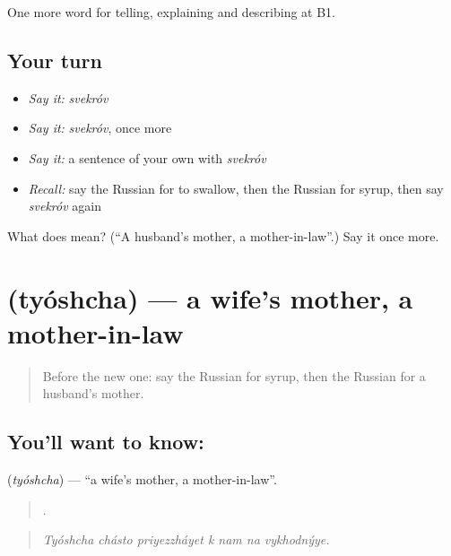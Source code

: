\begin{grammarlens}[title={What you've built}]
One more word for telling, explaining and describing at B1.
\end{grammarlens}

\subsection*{Your turn}
\begin{itemize}
\raggedright
  \item \emph{Say it:} \emph{svekróv}
  \item \emph{Say it:} \emph{svekróv}, once more
  \item \emph{Say it:} a sentence of your own with \emph{svekróv}
  \item \emph{Recall:} say the Russian for to swallow, then the Russian for syrup, then say \emph{svekróv} again
\end{itemize}

\begin{tcolorbox}[breakable,colback=teal!4,colframe=teal!35!black,title={Before you move on}]
What does  mean? (\textquotedblleft{}A husband's mother, a mother-in-law\textquotedblright{}.) Say it once more.
\end{tcolorbox}
\section[\texorpdfstring{\ru{тёща} (tyóshcha)}{тёща (tyóshcha)}]{ (tyóshcha) — a wife's mother, a mother-in-law}

\label{lesson:RU-C491-tyoshcha}



\begin{quote}
Before the new one: say the Russian for syrup, then the Russian for a husband's mother.
\end{quote}

\subsection*{You'll want to know: }
\textbf{} (\emph{tyóshcha}) — \textquotedblleft{}a wife's mother, a mother-in-law\textquotedblright{}.

\begin{quote}
      .
\end{quote}

\begin{quote}
\emph{Tyóshcha chásto priyezzháyet k nam na vykhodnýye.}
\end{quote}

